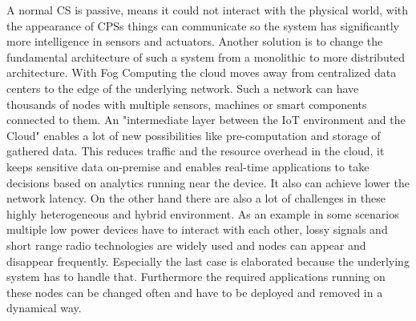 A normal \ac{CS} is passive, means it could not interact with the physical world, with the appearance of \acp{CPS} things can communicate so the system has significantly more intelligence in sensors and actuators.\autocite[cf.][p. 1363 f.]{Poovendran:2010}
\newpage
Another solution is to change the fundamental architecture of such a system from a monolithic to more distributed architecture.
With Fog Computing the cloud moves away from centralized data centers to the edge of the underlying network.\autocite[cf.][p. 380]{Pahl:2015}
Such a network can have thousands of nodes with multiple sensors, machines or smart components connected to them.
An "intermediate layer between the IoT environment and the Cloud"\autocite[p.236]{Brito:2016} enables a lot of new possibilities like pre-computation and storage of gathered data.
This reduces traffic and the resource overhead in the cloud, it keeps sensitive data on-premise\autocite[cf.][p.236]{Brito:2016} and enables real-time applications to take decisions based on analytics running near the device.
It also can achieve lower the network latency.
On the other hand there are also a lot of challenges in these highly heterogeneous and hybrid environment.
As an example in some scenarios multiple low power devices have to interact with each other, lossy signals and short range radio technologies are widely used and nodes can appear and disappear frequently.\autocite[cf.][p. 325]{Yannuzzi:2014}
Especially the last case is elaborated because the underlying system has to handle that.
Furthermore the required applications running on these nodes can be changed often and have to be deployed and removed in a dynamical way.


